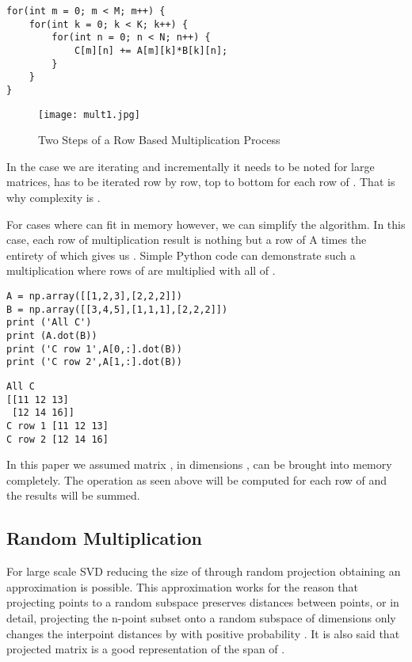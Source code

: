 \documentclass{article}
\begin{document}
\begin{verbatim}
for(int m = 0; m < M; m++) {
    for(int k = 0; k < K; k++) {
        for(int n = 0; n < N; n++) {
            C[m][n] += A[m][k]*B[k][n];
        }
    }
}
\end{verbatim}

\begin{figure}[h]
  \centering
  \texttt{[image: mult1.jpg]}
  \caption{Two Steps of a Row Based Multiplication Process}
  \label{fig:mult1}
\end{figure}

In the case we are iterating  and  incrementally it needs to be noted for
large  matrices,  has to be iterated row by row, top to bottom for each
row of . That is why complexity is .

For cases where  can fit in memory however, we can simplify the algorithm.
In this case, each row  of multiplication result  is nothing but a row
of A times the entirety of  which gives us . Simple Python code
can demonstrate such a multiplication where rows of  are multiplied with all
of .

\begin{verbatim}
A = np.array([[1,2,3],[2,2,2]])
B = np.array([[3,4,5],[1,1,1],[2,2,2]])
print ('All C')
print (A.dot(B))
print ('C row 1',A[0,:].dot(B))
print ('C row 2',A[1,:].dot(B))
\end{verbatim}

\begin{verbatim}
All C
[[11 12 13]
 [12 14 16]]
C row 1 [11 12 13]
C row 2 [12 14 16]
\end{verbatim}

In this paper we assumed matrix , in dimensions , can be brought
into memory completely. The operation as seen above will be computed for each
row of  and the results will be summed.

\subsection{Random  Multiplication}

For large scale SVD reducing the size of  through random projection obtaining
an approximation is possible. This approximation works for the reason that
projecting points to a random subspace preserves distances between points, or in
detail, projecting the n-point subset onto a random subspace of  dimensions only changes the interpoint distances by  with positive probability \cite{gupta}. It is also said that
projected matrix  is a good representation of the span of .
\end{document}
